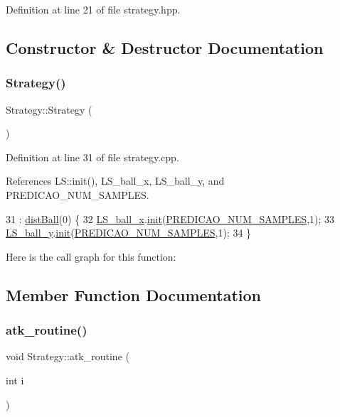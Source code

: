 Definition at line 21 of file strategy.\+hpp.



\subsection{Constructor \& Destructor Documentation}
\mbox{\label{class_strategy_a2021a15bbc4f0d13f7b92f8933db2235}} 
\subsubsection{\texorpdfstring{Strategy()}{Strategy()}}
{\footnotesize\ttfamily Strategy\+::\+Strategy (\begin{DoxyParamCaption}{ }\end{DoxyParamCaption})}



Definition at line 31 of file strategy.\+cpp.



References L\+S\+::init(), L\+S\+\_\+ball\+\_\+x, L\+S\+\_\+ball\+\_\+y, and P\+R\+E\+D\+I\+C\+A\+O\+\_\+\+N\+U\+M\+\_\+\+S\+A\+M\+P\+L\+ES.


\begin{DoxyCode}
31                    : \hyperlink{class_strategy_aff212e34800434ae7fa87fc55bca4531}{distBall}(0) \{
32     \hyperlink{class_strategy_ab9ecf12e9440d653dd732674b78ce02b}{LS\_ball\_x}.\hyperlink{class_l_s_a8f84bed13c9bf083beac8e5530d8832d}{init}(\hyperlink{strategy_8cpp_aebd0a50311cecd8ebec5d5a755292ae9}{PREDICAO\_NUM\_SAMPLES},1);
33     \hyperlink{class_strategy_aba301b4dd7bac24f2db4ca16c1f96608}{LS\_ball\_y}.\hyperlink{class_l_s_a8f84bed13c9bf083beac8e5530d8832d}{init}(\hyperlink{strategy_8cpp_aebd0a50311cecd8ebec5d5a755292ae9}{PREDICAO\_NUM\_SAMPLES},1);
34 \}
\end{DoxyCode}
Here is the call graph for this function\+:


\subsection{Member Function Documentation}
\mbox{\label{class_strategy_a7af0ec883fe9e80c31cf030ce203f956}} 
\subsubsection{\texorpdfstring{atk\+\_\+routine()}{atk\_routine()}}
{\footnotesize\ttfamily void Strategy\+::atk\+\_\+routine (\begin{DoxyParamCaption}\item[{int}]{i }\end{DoxyParamCaption})}



